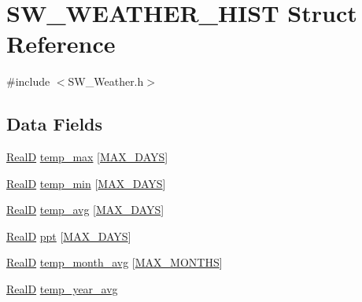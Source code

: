 \hypertarget{struct_s_w___w_e_a_t_h_e_r___h_i_s_t}{}\section{S\+W\+\_\+\+W\+E\+A\+T\+H\+E\+R\+\_\+\+H\+I\+ST Struct Reference}
\label{struct_s_w___w_e_a_t_h_e_r___h_i_s_t}


{\ttfamily \#include $<$S\+W\+\_\+\+Weather.\+h$>$}

\subsection*{Data Fields}
\begin{DoxyCompactItemize}
\item 
\hyperlink{generic_8h_af1c105fd5732f70b91ddaeda0cc340e3}{RealD} \hyperlink{struct_s_w___w_e_a_t_h_e_r___h_i_s_t_acd336b419dca4c9cddd46a32f305e143}{temp\+\_\+max} \mbox{[}\hyperlink{_times_8h_a01f08d46080872b9f4284873b7f9dee4}{M\+A\+X\+\_\+\+D\+A\+YS}\mbox{]}
\item 
\hyperlink{generic_8h_af1c105fd5732f70b91ddaeda0cc340e3}{RealD} \hyperlink{struct_s_w___w_e_a_t_h_e_r___h_i_s_t_a303edf6124c7432718098170f8005023}{temp\+\_\+min} \mbox{[}\hyperlink{_times_8h_a01f08d46080872b9f4284873b7f9dee4}{M\+A\+X\+\_\+\+D\+A\+YS}\mbox{]}
\item 
\hyperlink{generic_8h_af1c105fd5732f70b91ddaeda0cc340e3}{RealD} \hyperlink{struct_s_w___w_e_a_t_h_e_r___h_i_s_t_af9588a72d5368a35c402077fce55a14b}{temp\+\_\+avg} \mbox{[}\hyperlink{_times_8h_a01f08d46080872b9f4284873b7f9dee4}{M\+A\+X\+\_\+\+D\+A\+YS}\mbox{]}
\item 
\hyperlink{generic_8h_af1c105fd5732f70b91ddaeda0cc340e3}{RealD} \hyperlink{struct_s_w___w_e_a_t_h_e_r___h_i_s_t_aaf702e69c95ad3e67cd21bc57068cc08}{ppt} \mbox{[}\hyperlink{_times_8h_a01f08d46080872b9f4284873b7f9dee4}{M\+A\+X\+\_\+\+D\+A\+YS}\mbox{]}
\item 
\hyperlink{generic_8h_af1c105fd5732f70b91ddaeda0cc340e3}{RealD} \hyperlink{struct_s_w___w_e_a_t_h_e_r___h_i_s_t_a205f87e5374bcf367f4457695b14cedd}{temp\+\_\+month\+\_\+avg} \mbox{[}\hyperlink{_times_8h_a9c97e6841188b672e984a4eba7479277}{M\+A\+X\+\_\+\+M\+O\+N\+T\+HS}\mbox{]}
\item 
\hyperlink{generic_8h_af1c105fd5732f70b91ddaeda0cc340e3}{RealD} \hyperlink{struct_s_w___w_e_a_t_h_e_r___h_i_s_t_af17370ce88e1413f03e096a3cee4d0f8}{temp\+\_\+year\+\_\+avg}
\end{DoxyCompactItemize}



